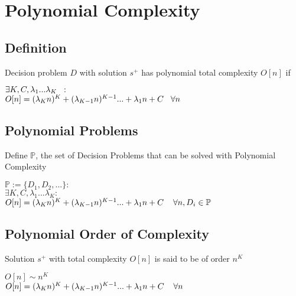 \documentclass[11pt]{article}
\begin{document}
\newpage
\section{Polynomial Complexity}

\subsection{Definition}
Decision problem $D$ with solution $s^+$ has polynomial total complexity $O[n]$ if
\begin{center}
$\exists K,C,\lambda_1...\lambda_K \hspace{2mm} :$
\\ \vspace{2mm}
$O[n] = (\lambda_K n)^K + (\lambda_{K-1} n)^{K-1}... + \lambda_1 n + C \hspace{3mm} \forall n$
\end{center}





\subsection{Polynomial Problems}
Define $\mathbb{P}$, the set of Decision Problems that can be solved with Polynomial Complexity
\begin{center}
$
\mathbb{P} := \{D_1,D_2,...\} : 
$
\\ \vspace{4mm}
$
\exists K,C,\lambda_1...\lambda_K : 
$
\\
$
O[n] = (\lambda_K n)^K + (\lambda_{K-1} n)^{K-1}... + \lambda_1 n + C \hspace{4mm} \forall n, D_i \in \mathbb{P}
$
\end{center}





\subsection{Polynomial Order of Complexity}
Solution $s^+$ with total complexity $O[n]$ is said to be of order $n^K$
\begin{center}
$
 O[n] \sim n^K
$
\\ \vspace{2mm}
$O[n] = (\lambda_{K} n)^{K} + (\lambda_{K-1} n)^{K-1}... + \lambda_1 n +  C \hspace{4mm} \forall n$
\end{center}
\end{document}
